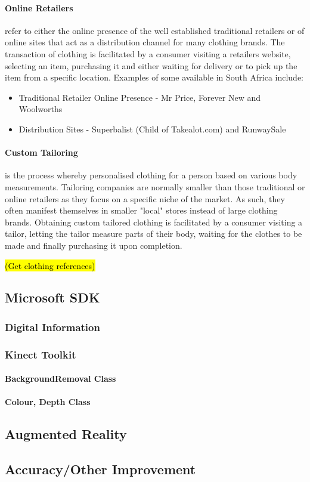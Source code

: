 \paragraph{Online Retailers}
refer to either the online presence of the well established traditional retailers or of online sites that act as a distribution channel for many clothing brands. The transaction of clothing is facilitated by a consumer visiting a retailers website, selecting an item, purchasing it and either waiting for delivery or to pick up the item from a specific location. Examples of some available in South Africa include:

\begin{itemize}
	\item Traditional Retailer Online Presence - Mr Price, Forever New and Woolworths
	\item Distribution Sites - Superbalist (Child of Takealot.com) and RunwaySale
\end{itemize}

\paragraph{Custom Tailoring}
is the process whereby personalised clothing for a person based on various body measurements. Tailoring companies are normally smaller than those traditional or online retailers as they focus on a specific niche of the market. As such, they often manifest themselves in smaller "local" stores instead of large clothing brands. Obtaining custom tailored clothing is facilitated by a consumer visiting a tailor, letting the tailor measure parts of their body, waiting for the clothes to be made and finally purchasing it upon completion. 

\hl{(Get clothing references)}


\subsection{Microsoft SDK}

\subsubsection{Digital Information}

\subsubsection{Kinect Toolkit}

\paragraph{BackgroundRemoval Class}

\paragraph{Colour, Depth Class}


\subsection{Augmented Reality}


\subsection{Accuracy/Other Improvement }